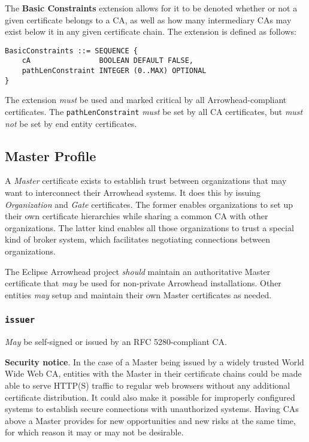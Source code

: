 The \textbf{Basic Constraints} extension allows for it to be denoted whether or not a given certificate belongs to a CA, as well as how many intermediary CAs may exist below it in any given certificate chain.
The extension is defined as follows:

\begin{verbatim}
BasicConstraints ::= SEQUENCE {
    cA                BOOLEAN DEFAULT FALSE,
    pathLenConstraint INTEGER (0..MAX) OPTIONAL
}
\end{verbatim}

The extension \textit{must} be used and marked critical by all Arrowhead-compliant certificates.
The \texttt{pathLenConstraint} \textit{must} be set by all CA certificates, but \textit{must not} be set by end entity certificates.

\subsection{Master Profile}

A \textit{Master} certificate exists to establish trust between organizations that may want to interconnect their Arrowhead systems.
It does this by issuing \textit{Organization} and \textit{Gate} certificates.
The former enables organizations to set up their own certificate hierarchies while sharing a common CA with other organizations.
The latter kind enables all those organizations to trust a special kind of broker system, which facilitates negotiating connections between organizations.

The Eclipse Arrowhead project \textit{should} maintain an authoritative Master certificate that \textit{may} be used for non-private Arrowhead installations.
Other entities \textit{may} setup and maintain their own Master certificates as needed.

\subsubsection{\texttt{issuer}}

\textit{May} be self-signed or issued by an RFC 5280-compliant CA.

\textbf{Security notice}.
In the case of a Master being issued by a widely trusted World Wide Web CA, entities with the Master in their certificate chains could be made able to serve HTTP(S) traffic to regular web browsers without any additional certificate distribution.
It could also make it possible for improperly configured systems to establish secure connections with unauthorized systems.
Having CAs above a Master provides for new opportunities and new risks at the same time, for which reason it may or may not be desirable.

